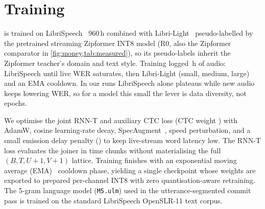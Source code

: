 \section{Training}\label{sec:training}

 \ultra{} is trained on
LibriSpeech~\cite{panayotov2015librispeech} 960\,h combined with Libri-Light~\cite{kahn2020librilight}
pseudo-labelled by the pretrained streaming Zipformer INT8 model (R0, also the Zipformer comparator
in \cref{fig:money,tab:measured}), so its pseudo-labels inherit the Zipformer teacher's domain and
text style. Training logged \CandTrainKh\,h of audio: LibriSpeech until live WER saturates, then
Libri-Light (small, medium, large) and an EMA cooldown. In our runs LibriSpeech alone plateaus while new
audio keeps lowering WER, so for a model this small the lever is data diversity, not epochs.

 We optimise the joint RNN-T and auxiliary CTC loss (CTC weight \CtcWeight) with
AdamW, cosine learning-rate decay, SpecAugment~\cite{park2019specaugment}, speed perturbation, and
a small emission delay penalty (\DelayPenalty) to keep live-stream word latency low. The RNN-T loss
evaluates the joiner in time chunks without materialising the full $(B,T,U{+}1,V{+}1)$ lattice.
Training finishes with an exponential moving average (EMA)~\cite{polyak1992ema} cooldown phase,
yielding a single checkpoint whose weights are exported to prepared per-channel INT8 with zero
quantisation-aware retraining. The 5-gram language model (\texttt{M5.ulm}) used in the
utterance-segmented commit pass is trained on the standard LibriSpeech OpenSLR-11 text corpus.
